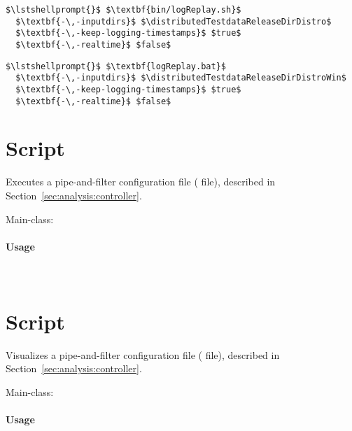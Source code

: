 
\setTextListing
\begin{lstlisting}[caption=Execution under UNIX-like systems]
$\lstshellprompt{}$ $\textbf{bin/logReplay.sh}$
  $\textbf{-\,-inputdirs}$ $\distributedTestdataReleaseDirDistro$ 
  $\textbf{-\,-keep-logging-timestamps}$ $true$ 
  $\textbf{-\,-realtime}$ $false$
\end{lstlisting}
\begin{lstlisting}[caption=Execution under Windows]
$\lstshellprompt{}$ $\textbf{logReplay.bat}$
  $\textbf{-\,-inputdirs}$ $\distributedTestdataReleaseDirDistroWin$ 
  $\textbf{-\,-keep-logging-timestamps}$ $true$ 
  $\textbf{-\,-realtime}$ $false$
\end{lstlisting}


\section{Script }\label{appendix:wrapperScripts:kaxRun}

Executes a \KiekerAnalysisPart{} pipe-and-filter configuration file ( file), %
described in Section~\ref{sec:analysis:controller}. %

\noindent Main-class: {\small {}}

\paragraph*{Usage}\

\setTextListing


\section{Script }\label{appendix:wrapperScripts:kaxViz}

Visualizes a \KiekerAnalysisPart{} pipe-and-filter configuration file ( file), %
described in Section~\ref{sec:analysis:controller}. %

\noindent Main-class: {\small {}}

\paragraph*{Usage}\

\setTextListing


